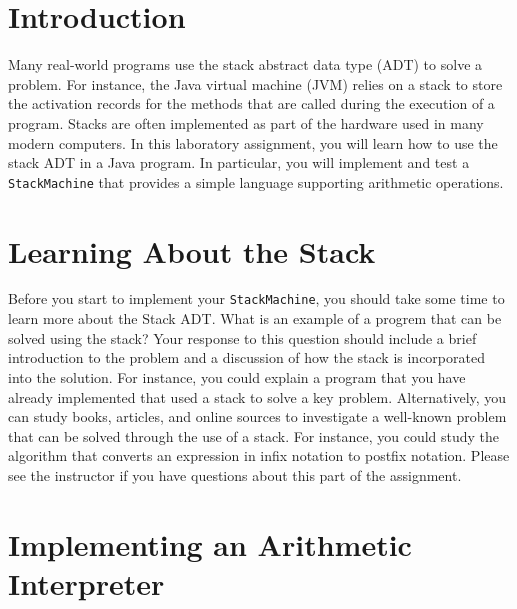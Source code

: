 


\usepackage[compact]{titlesec}


\section*{Introduction}

  Many real-world programs use the stack abstract data type (ADT) to solve a problem.  For instance, the Java virtual
  machine (JVM) relies on a stack to store the activation records for the methods that are called during the execution
  of a program.  Stacks are often implemented as part of the hardware used in many modern computers. In this laboratory
  assignment, you will learn how to use the stack ADT in a Java program.  In particular, you will implement and test a
  {\tt StackMachine} that provides a simple language supporting arithmetic operations.

\section*{Learning About the Stack}

  Before you start to implement your {\tt StackMachine}, you should take some time to learn more about the Stack ADT.
  What is an example of a progrem that can be solved using the stack? Your response to this question should include a
  brief introduction to the problem and a discussion of how the stack is incorporated into the solution. For instance,
  you could explain a program that you have already implemented that used a stack to solve a key problem. Alternatively,
  you can study books, articles, and online sources to investigate a well-known problem that can be solved through the
  use of a stack.  For instance, you could study the algorithm that converts an expression in infix notation to postfix
  notation. Please see the instructor if you have questions about this part of the assignment.



\section*{Implementing an Arithmetic Interpreter}

